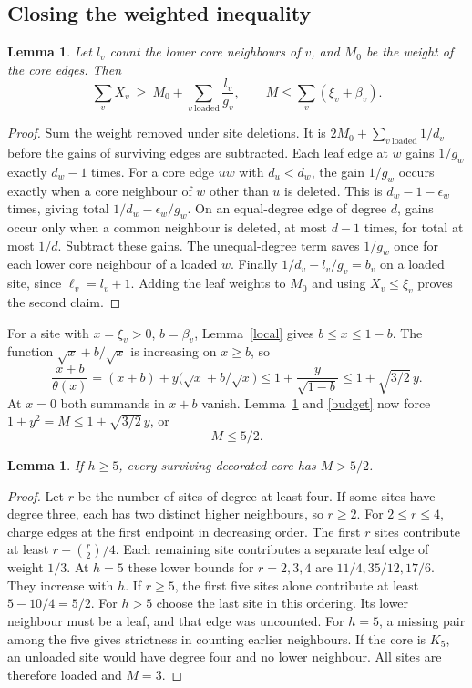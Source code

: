 \documentclass[11pt,a4paper]{article}
\newtheorem{lemma}[theorem]{Lemma}
\theoremstyle{remark}\newtheorem{remark}[theorem]{Remark}
\begin{document}
\subsection{Closing the weighted inequality}\label{sec:hand}
\begin{lemma}\label{saved}
Let $l_v$ count the lower \emph{core} neighbours of $v$, and $M_0$ be the weight of the core edges. Then
\[
 \sum_v X_v\ \ge\ M_0+\sum_{v\ \mathrm{loaded}}\frac{l_v}{g_v},
 \qquad M\le\sum_v(\xi_v+\beta_v).
\]
\end{lemma}
\begin{proof}
Sum the weight removed under site deletions. It is $2M_0+\sum_{v\ \mathrm{loaded}}1/d_v$ before the gains of surviving edges are subtracted. Each leaf edge at $w$ gains $1/g_w$ exactly $d_w-1$ times. For a core edge $uw$ with $d_u<d_w$, the gain $1/g_w$ occurs exactly when a core neighbour of $w$ other than $u$ is deleted. This is $d_w-1-\epsilon_w$ times, giving total $1/d_w-\epsilon_w/g_w$. On an equal-degree edge of degree $d$, gains occur only when a common neighbour is deleted, at most $d-1$ times, for total at most $1/d$. Subtract these gains. The unequal-degree term saves $1/g_w$ once for each lower core neighbour of a loaded $w$. Finally $1/d_v-l_v/g_v=b_v$ on a loaded site, since $\ell_v=l_v+1$. Adding the leaf weights to $M_0$ and using $X_v\le\xi_v$ proves the second claim.
\end{proof}
For a site with $x=\xi_v>0$, $b=\beta_v$, Lemma~\ref{local} gives $b\le x\le1-b$. The function $\sqrt{x}+b/\sqrt{x}$ is increasing on $x\ge b$, so
\[
 \frac{x+b}{\theta(x)}
   =(x+b)+y\bigl(\sqrt{x}+b/\sqrt{x}\bigr)
   \le1+\frac{y}{\sqrt{1-b}}\le1+\sqrt{3/2}\,y .
\]
At $x=0$ both summands in $x+b$ vanish. Lemma~\ref{saved} and \eqref{budget} now force $1+y^2=M\le1+\sqrt{3/2}\,y$, or
\begin{equation}M\le 5/2.\label{fivehalf}\end{equation}
\begin{lemma} If $h\ge5$, every surviving decorated core has $M>5/2$.\end{lemma}
\begin{proof}
Let $r$ be the number of sites of degree at least four. If some sites have degree three, each has two distinct higher neighbours, so $r\ge2$. For $2\le r\le4$, charge edges at the first endpoint in decreasing order. The first $r$ sites contribute at least $r-\binom r2/4$. Each remaining site contributes a separate leaf edge of weight $1/3$. At $h=5$ these lower bounds for $r=2,3,4$ are $11/4,35/12,17/6$. They increase with $h$. If $r\ge5$, the first five sites alone contribute at least $5-10/4=5/2$. For $h>5$ choose the last site in this ordering. Its lower neighbour must be a leaf, and that edge was uncounted. For $h=5$, a missing pair among the five gives strictness in counting earlier neighbours. If the core is $K_5$, an unloaded site would have degree four and no lower neighbour. All sites are therefore loaded and $M=3$.
\end{proof}
\end{document}
